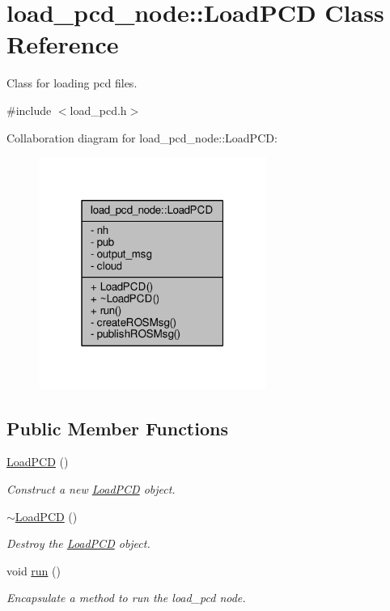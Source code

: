 \hypertarget{classload__pcd__node_1_1_load_p_c_d}{}\section{load\+\_\+pcd\+\_\+node\+:\+:Load\+P\+CD Class Reference}
\label{classload__pcd__node_1_1_load_p_c_d}


Class for loading pcd files.  




{\ttfamily \#include $<$load\+\_\+pcd.\+h$>$}



Collaboration diagram for load\+\_\+pcd\+\_\+node\+:\+:Load\+P\+CD\+:\nopagebreak
\begin{figure}[H]
\begin{center}
\leavevmode
\includegraphics[width=211pt]{classload__pcd__node_1_1_load_p_c_d__coll__graph}
\end{center}
\end{figure}
\subsection*{Public Member Functions}
\begin{DoxyCompactItemize}
\item 
\hyperlink{classload__pcd__node_1_1_load_p_c_d_ac99310fda12afce4e28dc5c5780d20f9}{Load\+P\+CD} ()
\begin{DoxyCompactList}\small\item\em Construct a new \hyperlink{classload__pcd__node_1_1_load_p_c_d}{Load\+P\+CD} object. \end{DoxyCompactList}\item 
\hyperlink{classload__pcd__node_1_1_load_p_c_d_ac1fee78fc5413befd139f87717e0e1df}{$\sim$\+Load\+P\+CD} ()
\begin{DoxyCompactList}\small\item\em Destroy the \hyperlink{classload__pcd__node_1_1_load_p_c_d}{Load\+P\+CD} object. \end{DoxyCompactList}\item 
void \hyperlink{classload__pcd__node_1_1_load_p_c_d_a3a24d5533df3da5fd52e6bdbc9b71abe}{run} ()
\begin{DoxyCompactList}\small\item\em Encapsulate a method to run the load\+\_\+pcd node. \end{DoxyCompactList}\end{DoxyCompactItemize}
